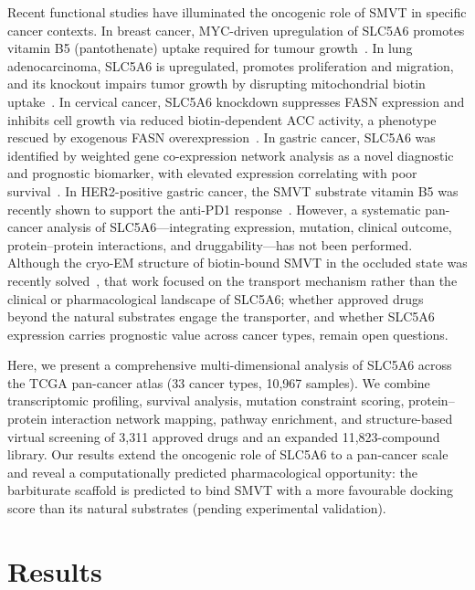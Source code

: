 \documentclass[pdflatex,sn-nature]{sn-jnl}
\begin{document}
Recent functional studies have illuminated the oncogenic role of SMVT in specific cancer contexts. In breast cancer, MYC-driven upregulation of SLC5A6 promotes vitamin B5 (pantothenate) uptake required for tumour growth~\cite{kreuzaler2023}. In lung adenocarcinoma, SLC5A6 is upregulated, promotes proliferation and migration, and its knockout impairs tumor growth by disrupting mitochondrial biotin uptake~\cite{zheng2025}. In cervical cancer, SLC5A6 knockdown suppresses FASN expression and inhibits cell growth via reduced biotin-dependent ACC activity, a phenotype rescued by exogenous FASN overexpression~\cite{wang2026}. In gastric cancer, SLC5A6 was identified by weighted gene co-expression network analysis as a novel diagnostic and prognostic biomarker, with elevated expression correlating with poor survival~\cite{sun2020}. In HER2-positive gastric cancer, the SMVT substrate vitamin B5 was recently shown to support the anti-PD1 response~\cite{wang2026b}. However, a systematic pan-cancer analysis of SLC5A6---integrating expression, mutation, clinical outcome, protein--protein interactions, and druggability---has not been performed. Although the cryo-EM structure of biotin-bound SMVT in the occluded state was recently solved~\cite{zhen2026}, that work focused on the transport mechanism rather than the clinical or pharmacological landscape of SLC5A6; whether approved drugs beyond the natural substrates engage the transporter, and whether SLC5A6 expression carries prognostic value across cancer types, remain open questions.

Here, we present a comprehensive multi-dimensional analysis of SLC5A6 across the TCGA pan-cancer atlas (33 cancer types, 10,967 samples). We combine transcriptomic profiling, survival analysis, mutation constraint scoring, protein--protein interaction network mapping, pathway enrichment, and structure-based virtual screening of 3,311 approved drugs and an expanded 11,823-compound library. Our results extend the oncogenic role of SLC5A6 to a pan-cancer scale and reveal a computationally predicted pharmacological opportunity: the barbiturate scaffold is predicted to bind SMVT with a more favourable docking score than its natural substrates (pending experimental validation).


\section*{Results}
\end{document}
